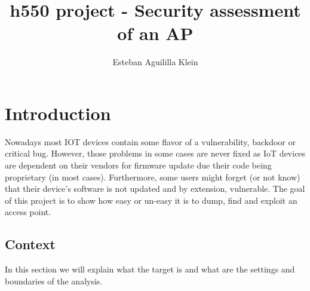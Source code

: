 \documentclass{article}
\title{h550 project - Security assessment of an AP}
\author{Esteban Aguililla Klein}
\begin{document}
\maketitle	
\tableofcontents
\newpage
\section{Introduction}
Nowadays most IOT devices contain some flavor of a vulnerability, backdoor or critical bug. However, those problems in some cases are never fixed as IoT devices are dependent on their vendors for firmware update due their code being proprietary (in most cases). Furthermore, some users might forget (or not know) that their device's software is not updated and by extension, vulnerable. The goal of this project is to show how easy or un-easy it is to dump, find and exploit an access point.
\subsection{Context}
In this section we will explain what the target is and what are the settings and boundaries of the analysis.
\end{document}

